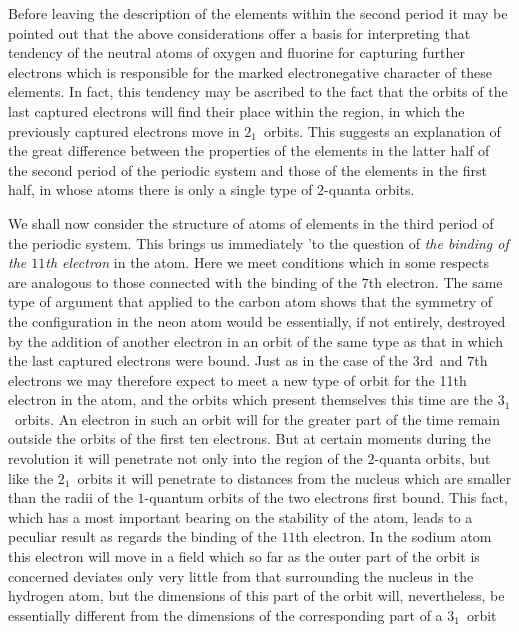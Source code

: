 Before leaving the description of the elements within the second
period it may be pointed out that the above considerations offer a
basis for interpreting that tendency of the neutral atoms of oxygen
and fluorine for capturing further electrons which is responsible for
the marked electronegative character of these elements. In fact,
this tendency may be ascribed to the fact that the orbits of
the last captured electrons will find their place within the region,
in which the previously captured electrons move in $2_{1}$~orbits. This
suggests an explanation of the great difference between the properties
of the elements in the latter half of the second period of the
periodic system and those of the elements in the first half, in whose
atoms there is only a single type of $2$-quanta orbits.

 We shall now consider the
structure of atoms of elements in the third period of the periodic
system. This brings us immediately 'to the question of \emph{the binding
of the $11$th electron} in the atom. Here we meet conditions which
in some respects are analogous to those connected with the binding
of the $7$th electron. The same type of argument that applied to
the carbon atom shows that the symmetry of the configuration in
the neon atom would be essentially, if not entirely, destroyed by
the addition of another electron in an orbit of the same type as
that in which the last captured electrons were bound. Just as in
the case of the $3$rd~and $7$th electrons we may therefore expect to
meet a new type of orbit for the 11th electron in the atom, and the
orbits which present themselves this time are the $3_{1}$~orbits. An
electron in such an orbit will for the greater part of the time remain
outside the orbits of the first ten electrons. But at certain moments
during the revolution it will penetrate not only into the region of
the $2$-quanta orbits, but like the $2_{1}$~orbits it will penetrate to
distances from the nucleus which are smaller than the radii of
the $1$-quantum orbits of the two electrons first bound. This fact,
which has a most important bearing on the stability of the atom,
leads to a peculiar result as regards the binding of the $11$th electron.
In the sodium atom this electron will move in a field which so far
as the outer part of the orbit is concerned deviates only very little
from that surrounding the nucleus in the hydrogen atom, but the
dimensions of this part of the orbit will, nevertheless, be essentially
different from the dimensions of the corresponding part of a $3_{1}$~orbit
